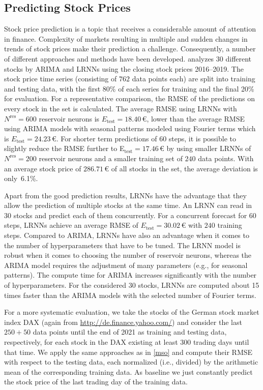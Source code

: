 \documentclass[preprint,12pt,times,authoryear]{elsarticle}%
\theoremstyle{definition}
\begin{document}
\subsection{Predicting Stock Prices}\label{stock}

Stock price prediction is a topic that receives a considerable amount of
attention in finance. Complexity of markets resulting in multiple and sudden
changes in trends of stock prices make their prediction a challenge.
Consequently, a number of different approaches and methods have been developed.
\citet{Lit20} analyzes $30$ different stocks by ARIMA and LRNNs using the
closing stock prices 2016--2019. The stock price time series (consisting of
$762$ data points each) are split into training and testing data, with the first
80\% of each series for training and the final 20\% for evaluation. For a
representative comparison, the RMSE of the predictions on every stock in the set
is calculated. The average RMSE using LRNNs with $N^\mathrm{res}=600$ reservoir
neurons is $E_\mathrm{test}=18.40${\,\euro}, lower than the average RMSE using
ARIMA models with seasonal patterns modeled using Fourier terms
\citep[p.~321]{HA13} which is $E_\mathrm{test}=24.23${\,\euro}. For shorter term
predictions of 60 steps, it is possible to slightly reduce the RMSE further to
E$_\mathrm{test}=17.46${\,\euro} by using smaller LRNNs of $N^\mathrm{res}=200$
reservoir neurons and a smaller training set of $240$ data points. With an
average stock price of $286.71${\,\euro} of all stocks in the set, the average
deviation is only~6.1\%.

Apart from the good prediction results, LRNNs have the advantage that they allow
the prediction of multiple stocks at the same time. An LRNN can read in 30
stocks and predict each of them concurrently. For a concurrent forecast for $60$
steps, LRNNs achieve an average RMSE of
$E_\mathrm{test}=30.02${\,\euro} with $240$ training steps. Compared to ARIMA,
LRNNs have also an advantage when it comes to the number of hyperparameters that
have to be tuned. The LRNN model is robust when it comes to choosing the number
of reservoir neurons, whereas the ARIMA model requires the adjustment of many
parameters (e.g., for seasonal patterns). The compute time for ARIMA increases
significantly with the number of hyperparameters. For the considered $30$
stocks, LRNNs are computed about 15 times faster than the ARIMA models with the
selected number of Fourier terms.

For a more systematic evaluation, we take the stocks of the German stock market
index DAX (again from \url{http://de.finance.yahoo.com/}) and consider the last
$250+50$ data points until the end of 2021 as training and testing data,
respectively, for each stock in the DAX existing at least $300$ trading days
until that time. We apply the same approaches as in \cref{mso} and compute their
RMSE with respect to the testing data, each normalized (i.e., divided) by the
arithmetic mean of the corresponding training data. As baseline we just
constantly predict the stock price of the last trading day of the training data.
\end{document}
